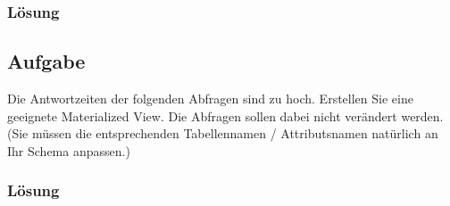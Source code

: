 \subsubsection*{Lösung}
\label{sec:uebung_05.aufgabe_02.loesung}

\subsection{Aufgabe}
\label{sec:uebung_05.aufgabe_03}
Die Antwortzeiten der folgenden Abfragen sind zu hoch. Erstellen Sie eine geeignete Materialized View. Die Abfragen sollen dabei nicht verändert werden. (Sie müssen die entsprechenden Tabellennamen / Attributsnamen natürlich an Ihr Schema anpassen.)

\subsubsection*{Lösung}
\label{sec:uebung_05.aufgabe_03.loesung}
